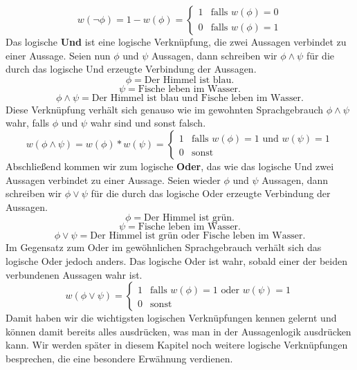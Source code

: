 \documentclass[11pt,a4paper,leqno]{report}
\numberwithin{equation}{chapter}
\begin{document}
\begin{equation}
w(\neg\phi)= 1 - w(\phi)=
\begin{cases} 
1 & \text{falls }w(\phi)=0\\
0 & \text{falls }w(\phi)=1
\end{cases}
\end{equation}
Das logische \textbf{Und} ist eine logische Verkn\"upfung, die zwei Aussagen verbindet zu einer Aussage. Seien nun $\phi$ und $\psi$ Aussagen, dann schreiben wir $\phi\wedge\psi$ f\"ur die durch das logische Und erzeugte Verbindung der Aussagen.
$$\phi = \text{Der Himmel ist blau.}$$
$$\psi = \text{Fische leben im Wasser.}$$
$$\phi\wedge\psi = \text{Der Himmel ist blau und Fische leben im Wasser.}$$
Diese Verkn\"upfung verh\"alt sich genauso wie im gewohnten Sprachgebrauch $\phi\wedge\psi$ wahr, falls $\phi$ und $\psi$ wahr sind und sonst falsch.
\begin{equation}
w(\phi\wedge\psi) = w(\phi) * w(\psi)=
\begin{cases} 
1 & \text{falls }w(\phi)=1\text{ und }w(\psi)=1\\
0 & \text{sonst}
\end{cases}
\end{equation}
Abschlie\ss{}end kommen wir zum logische \textbf{Oder}, das wie das logische Und zwei Aussagen verbindet zu einer Aussage. Seien wieder $\phi$ und $\psi$ Aussagen, dann schreiben wir $\phi\vee\psi$ f\"ur die durch das logische Oder erzeugte Verbindung der Aussagen.
$$\phi = \text{Der Himmel ist gr\"un.}$$
$$\psi = \text{Fische leben im Wasser.}$$
$$\phi\vee\psi = \text{Der Himmel ist gr\"un oder Fische leben im Wasser.}$$
Im Gegensatz zum Oder im gew\"ohnlichen Sprachgebrauch verh\"alt sich das logische Oder jedoch anders. Das logische Oder ist wahr, sobald einer der beiden verbundenen Aussagen wahr ist.
\begin{equation}
w(\phi\vee\psi) = 
\begin{cases} 
1 & \text{falls }w(\phi)=1\text{ oder }w(\psi)=1\\
0 & \text{sonst}
\end{cases}
\end{equation}
Damit haben wir die wichtigsten logischen Verkn\"upfungen kennen gelernt und k\"onnen damit bereits alles ausdr\"ucken, was man in der Aussagenlogik ausdr\"ucken kann. Wir werden sp\"ater in diesem Kapitel noch weitere logische Verkn\"upfungen besprechen, die eine besondere Erw\"ahnung verdienen.\\
\\
\end{document}
